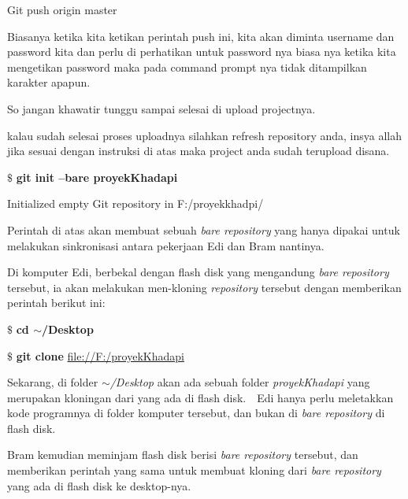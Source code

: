 Git push origin master  \par
\noindent 
Biasanya ketika kita ketikan perintah push ini, kita akan diminta username dan password kita dan perlu di perhatikan untuk password nya biasa nya ketika kita mengetikan password maka pada command prompt nya tidak ditampilkan karakter apapun. \par
\noindent 
So jangan khawatir tunggu sampai selesai di upload projectnya. \par
\noindent 
kalau sudah selesai proses uploadnya silahkan refresh repository anda, insya allah jika sesuai dengan instruksi di atas maka project anda sudah terupload disana. \par
\vspace{12pt}
\vspace{12pt}
\noindent 
 $  \$  $ \textbf{git init --bare proyekKhadapi} \par
\noindent 
Initialized empty Git repository in F:/proyekkhadpi/ \par
\noindent 
Perintah di atas akan membuat sebuah \textit{bare repository} yang hanya dipakai untuk melakukan sinkronisasi antara pekerjaan Edi dan Bram nantinya. \par
\vspace{12pt}
\noindent 
Di komputer Edi, berbekal dengan flash disk yang mengandung \textit{bare repository} tersebut, ia akan melakukan men-kloning \textit{repository} tersebut dengan memberikan perintah berikut ini: \par
\noindent 
 $  \$  $ \textbf{cd  $  \sim  $/Desktop} \par
\noindent 
 $  \$  $ \textbf{git clone }\href{file://F:/proyekBadai}{file://F:/proyekKhadapi}
 \par
\noindent 
\vspace{12pt}
\noindent 
\vspace{12pt}
\noindent 
\vspace{12pt}
\noindent 
Sekarang, di folder\textit{  $  \sim  $/Desktop} akan ada sebuah folder \textit{proyek}\textit{Khadapi} yang merupakan kloningan dari yang ada di flash disk. $  $ $  $ Edi hanya perlu meletakkan kode programnya di folder komputer tersebut, dan bukan di \textit{bare repository} di flash disk. \par
\vspace{12pt}
\noindent 
Bram kemudian meminjam flash disk berisi \textit{bare repository} tersebut, dan memberikan perintah yang sama untuk membuat kloning dari \textit{bare repository} yang ada di flash disk ke desktop-nya. \par

